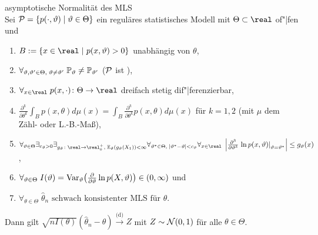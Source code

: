 \begin{Satz}{asymptotische Normalität des MLS}\\
    Sei $\P = \{p(\cdot, \theta) \;|\; \theta \in \Theta\}$
    ein reguläres statistisches Modell mit $\Theta \subset \real$ of"|fen und
    \begin{enumerate}
        \item
        $B := \{x \in \real \;|\ p(x, \theta) > 0\}$ unabhängig von $\theta$,
        
        \item
        $\forall_{\theta, \theta' \in \Theta,\; \theta \not= \theta'}\;
        \PP_\theta \not= \PP_{\theta'}$
        ($\P$ ist ),
        
        \item
        $\forall_{x \in \real}\; p(x, \cdot)\colon \Theta \rightarrow \real$ dreifach stetig
        dif"|ferenzierbar,
        
        \item
        $\frac{\partial^k}{\partial \theta^k} \int_B p(x, \theta) d\mu(x) =
        \int_B \frac{\partial^k}{\partial \theta^k} p(x, \theta) d\mu(x)$ für $k = 1, 2$
        (mit $\mu$ dem Zähl- oder L.-B.-Maß),
        
        \item
        $\forall_{\theta \in \Theta} \exists_{c_\theta > 0}
        \exists_{g_\theta\colon \real \rightarrow \real_0^+,\; \EE_\theta(g_\theta(X_1)) < \infty}
        \forall_{\theta^\ast \in \Theta,\; |\theta^\ast - \theta| < c_\theta}
        \forall_{x \in \real}\;
        \left|\frac{\partial^3}{\partial \theta^3}
        \left.\ln p(x, \theta)\right|_{\theta = \theta^\ast}\right| \le g_\theta(x)$,
        
        \item
        $\forall_{\theta \in \Theta}\; I(\theta) =
        \Var_\theta\!\left(\frac{\partial}{\partial \theta} \ln p(X, \theta)\right) \in
        (0, \infty)$ und
        
        \item
        $\forall_{\theta \in \Theta}\; \widehat{\theta}_n \text{ schwach konsistenter MLS für }
        \theta$.
    \end{enumerate}
    Dann gilt $\sqrt{n I(\theta)} (\widehat{\theta}_n - \theta)
    \xrightarrow{\text{(d)}} Z$ mit $Z \sim \N(0, 1)$ für alle $\theta \in \Theta$.
\end{Satz}

\pagebreak
